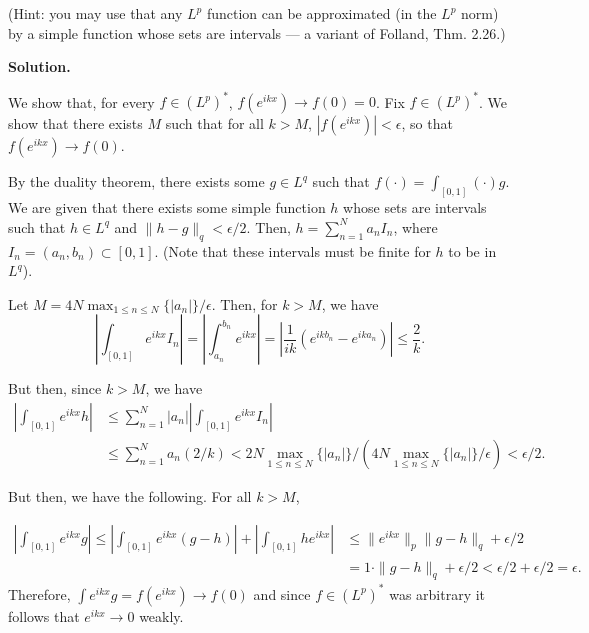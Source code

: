\documentclass[11pt]{article}
\begin{document}
\begin{enumerate}[label=\arabic*.]
(Hint: you may use that any $L^p$ function can be approximated (in the $L^p$ norm) by a simple function whose sets are intervals — a variant of Folland, Thm. 2.26.)

\vspace{1em}

\textbf{Solution.}

We show that, for every $f \in (L^{p})^{*}$, $f(e^{ikx}) \to f(0) = 0$.
Fix $f \in (L^{p})^{*}$.
We show that there exists $M$ such that for all $k > M$, $|f(e^{ikx})| < \epsilon$, so that $f(e^{ikx}) \to f(0)$.

By the duality theorem, there exists some $g \in L^{q}$ such that $f(\cdot) = \int_{[0, 1]} (\cdot) g$.
We are given that there exists some simple function $h$ whose sets are intervals such that $h \in L^{q}$ and $\|h - g\|_{q} < \epsilon / 2$.
Then, $h = \sum_{n = 1}^{N} a_n I_n$, where $I_n = (a_n, b_n) \subset  [0, 1]$. 
(Note that these intervals must be finite for $h$ to be in $L^{q}$).

Let $M = 4 N \max_{1 \leq n \leq N} \{|a_n|\} / \epsilon$.
Then, for $k > M$, we have 
\[
\left|\int_{[0, 1]} e^{ikx} I_n\right| = \left|\int_{a_n}^{b_n} e^{ikx}\right| =\left| \frac{1}{ik} (e^{ikb_n} - e^{ika_n})\right| \leq \frac{2}{k}
.\] 

But then, since $k > M$, we have
\begin{align*}
    \left|\int_{[0, 1]} e^{ikx} h \right| &\leq \sum_{n = 1}^{N} |a_n| \left| \int_{[0, 1]} e^{ikx}I_n  \right|\\
                                          &\leq \sum_{n=1}^{N} a_n (2 / k) < 2 N \max_{1 \leq n \leq N} \{|a_n|\} / (4 N \max_{1 \leq n \leq N} \{|a_n|\} / \epsilon) < \epsilon / 2
.\end{align*}

But then, we have the following.
For all $k > M$,

\begin{align*}
    \left|\int_{[0, 1]} e^{ikx} g \right| \leq \left| \int_{[0, 1]} e^{ikx} ( g - h) \right| +  \left|\int_{[0, 1]} h e^{ikx} \right| &\leq \|e^{ikx}\|_{p} \|g - h\|_{q} + \epsilon / 2\\
                                                                                                                                      &= 1\cdot  \|g - h\|_{q} + \epsilon / 2 < \epsilon / 2 + \epsilon / 2 = \epsilon
.\end{align*}
Therefore, $\int e^{ikx} g = f(e^{ikx}) \to f(0)$ and since $f \in (L^{p})^{*}$ was arbitrary it follows that $e^{ikx} \to 0$ weakly.


\end{enumerate}
\end{document}

